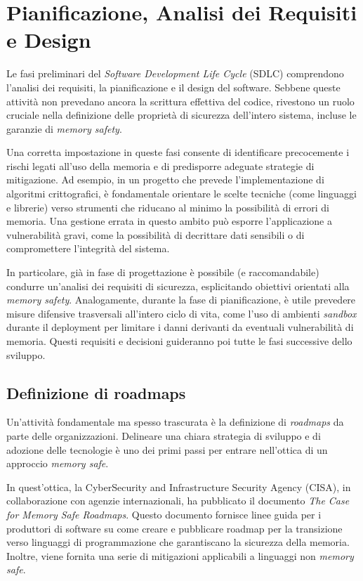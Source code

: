 \section{Pianificazione, Analisi dei Requisiti e Design}
\label{sec:planning_requirements_design}

Le fasi preliminari del \textit{Software Development Life Cycle} (SDLC)
comprendono l'analisi dei requisiti, la pianificazione e il design del software.
Sebbene queste attività non prevedano ancora la scrittura effettiva del codice, rivestono
un ruolo cruciale nella definizione delle proprietà di sicurezza dell'intero sistema,
incluse le garanzie di \textit{memory safety}.

Una corretta impostazione in queste fasi consente di identificare precocemente i
rischi legati all'uso della memoria e di predisporre adeguate strategie di mitigazione.
Ad esempio, in un progetto che prevede l'implementazione di algoritmi crittografici,
è fondamentale orientare le scelte tecniche (come linguaggi e librerie) verso
strumenti che riducano al minimo la possibilità di errori di memoria. Una gestione
errata in questo ambito può esporre l'applicazione a vulnerabilità gravi, come
la possibilità di decrittare dati sensibili o di compromettere l'integrità del
sistema.

In particolare, già in fase di progettazione è possibile (e raccomandabile) condurre
un'analisi dei requisiti di sicurezza, esplicitando obiettivi orientati alla
\textit{memory safety}. Analogamente, durante la fase di pianificazione, è utile
prevedere misure difensive trasversali all'intero ciclo di vita, come l'uso di ambienti
\textit{sandbox} durante il deployment per limitare i danni derivanti da
eventuali vulnerabilità di memoria. Questi requisiti e decisioni guideranno poi tutte
le fasi successive dello sviluppo.

\subsection{Definizione di roadmaps}
\label{sec:roadmap} Un'attività fondamentale ma spesso trascurata è la definizione
di \textit{roadmaps} da parte delle organizzazioni. Delineare una chiara strategia
di sviluppo e di adozione delle tecnologie è uno dei primi passi per entrare nell'ottica
di un approccio \textit{memory safe}.

In quest'ottica, la CyberSecurity and Infrastructure Security Agency (CISA), in
collaborazione con agenzie internazionali, ha pubblicato il documento \textit{The
Case for Memory Safe Roadmaps}\cite{memory_safe_roadmaps}. Questo documento
fornisce linee guida per i produttori di software su come creare e pubblicare
roadmap per la transizione verso linguaggi di programmazione che garantiscano la
sicurezza della memoria. Inoltre, viene fornita una serie di mitigazioni
applicabili a linguaggi non \textit{memory safe}.

